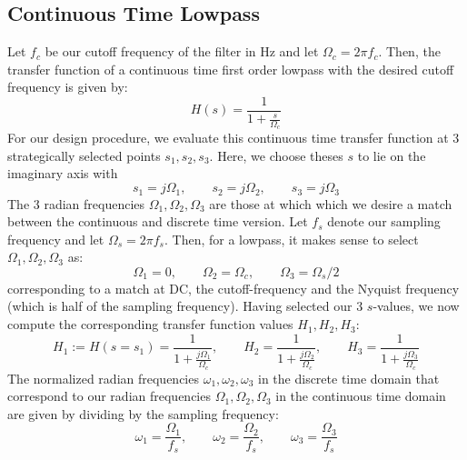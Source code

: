 \subsection{Continuous Time Lowpass}
Let $f_c$ be our cutoff frequency of the filter in Hz and let $\Omega_c = 2 \pi f_c$. Then, the transfer function of a continuous time first order lowpass with the desired cutoff frequency is given by:
\begin{equation}
 H(s) = \frac{1}{1 + \frac{s}{\Omega_c} }
\end{equation}
For our design procedure, we evaluate this continuous time transfer function at 3 strategically selected points $s_1, s_2, s_3$. Here, we choose theses $s$ to lie on the imaginary axis with 
\begin{equation}
 s_1 = j \Omega_1, \qquad s_2 = j \Omega_2, \qquad s_3 = j \Omega_3
\end{equation}
The 3 radian frequencies $\Omega_1, \Omega_2, \Omega_3$ are those at which which we desire a match between the continuous and discrete time version. Let $f_s$ denote our sampling frequency and let $\Omega_s = 2 \pi f_s$. Then, for a lowpass, it makes sense to select $\Omega_1, \Omega_2, \Omega_3$ as:
\begin{equation}
 \Omega_1 = 0, \qquad \Omega_2 = \Omega_c, \qquad \Omega_3 = \Omega_s / 2
\end{equation}
corresponding to a match at DC, the cutoff-frequency and the Nyquist frequency (which is half of the sampling frequency). Having selected our 3 $s$-values, we now compute the corresponding transfer function values $H_1, H_2, H_3$:
\begin{equation}
 H_1 := H(s = s_1) = \frac{1}{1 + \frac{j \Omega_1}{\Omega_c}}, \qquad 
 H_2               = \frac{1}{1 + \frac{j \Omega_2}{\Omega_c}}, \qquad
 H_3               = \frac{1}{1 + \frac{j \Omega_3}{\Omega_c}}
\end{equation}
The normalized radian frequencies $\omega_1, \omega_2, \omega_3$ in the discrete time domain that correspond to our radian frequencies $\Omega_1, \Omega_2, \Omega_3$ in the continuous time domain are given by dividing by the sampling frequency:
\begin{equation}
 \omega_1 = \frac{\Omega_1}{f_s}, \qquad \omega_2 = \frac{\Omega_2}{f_s}, \qquad \omega_3 = \frac{\Omega_3}{f_s}
\end{equation}


